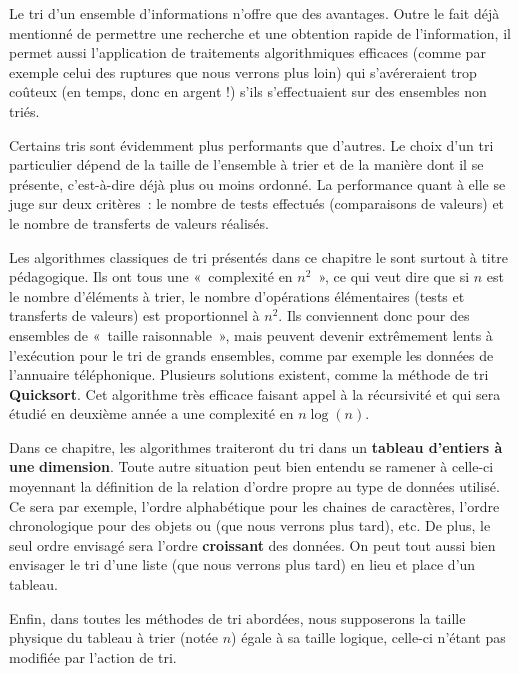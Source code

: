 	Le tri d’un ensemble d’informations n’offre que des avantages. Outre le
	fait déjà mentionné de permettre une recherche et une obtention rapide
	de l’information, il permet aussi l’application de traitements
	algorithmiques efficaces (comme par exemple celui des ruptures que nous
	verrons plus loin) qui s’avéreraient trop coûteux (en temps, donc en
	argent !) s’ils s’effectuaient sur des ensembles non triés.

	Certains tris sont évidemment plus performants que d’autres. Le choix
	d’un tri particulier dépend de la taille de l’ensemble à trier et de la
	manière dont il se présente, c’est-à-dire déjà plus ou moins ordonné.
	La performance quant à elle se juge sur deux critères~: le nombre de
	tests effectués (comparaisons de valeurs) et le nombre de transferts de
	valeurs réalisés. 
	
	Les algorithmes classiques de tri présentés dans ce chapitre le sont
	surtout à titre pédagogique. Ils ont tous une «~complexité en
	$n^2$~», ce qui veut dire que si $n$ est le nombre
	d’éléments à trier, le nombre d’opérations élémentaires (tests et
	transferts de valeurs) est proportionnel à $n^2$. Ils conviennent
	donc pour des ensembles de «~taille raisonnable~», mais peuvent devenir
	extrêmement lents à l’exécution pour le tri de grands ensembles, comme
	par exemple les données de l’annuaire téléphonique. Plusieurs solutions
	existent, comme la méthode de tri \textbf{Quicksort}. Cet algorithme
	très efficace faisant appel à la récursivité et qui sera étudié en
	deuxième année a une complexité en $n \log(n)$. 

	Dans ce chapitre, les algorithmes traiteront du tri dans un
	\textbf{tableau d’entiers à une }\textbf{dimension}. Toute autre
	situation peut bien entendu se ramener à celle-ci moyennant la
	définition de la relation d’ordre propre au type de données utilisé. Ce
	sera par exemple, l’ordre alphabétique pour les chaines de caractères,
	l’ordre chronologique pour des objets  ou
	 (que nous verrons
	plus tard), etc. De plus, le seul ordre envisagé sera l’ordre
	\textbf{croissant} des données. On peut tout aussi bien envisager le
	tri d’une liste (que nous verrons plus tard) en lieu et place d’un tableau.

	Enfin, dans toutes les méthodes de tri abordées, nous supposerons la
	taille physique du tableau à trier (notée $n$) égale à sa taille
	logique, celle-ci n’étant pas modifiée par l’action de tri.


